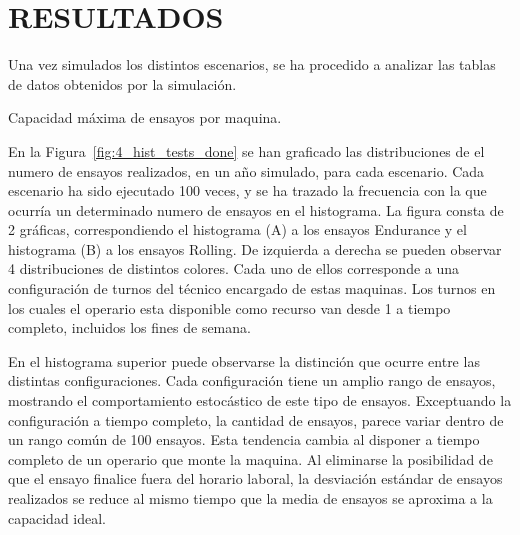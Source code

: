 
\section{RESULTADOS}

Una vez simulados los distintos escenarios,
se ha procedido a analizar las tablas de datos obtenidos por la simulación.

\begin{table}
	\centering
	\caption{Capacidad máxima de ensayos por maquina.}
	
	\label{tab:4_tbl_max_cap}
\end{table}

En la Figura~\ref{fig:4_hist_tests_done} se han graficado
las distribuciones de el numero de ensayos realizados, en un año simulado,
para cada escenario.
Cada escenario ha sido ejecutado 100 veces, y se ha trazado la frecuencia
con la que ocurría un determinado numero de ensayos en el histograma.
La figura consta de 2 gráficas,
correspondiendo el histograma (A) a los ensayos Endurance
y el histograma (B) a los ensayos Rolling.
De izquierda a derecha se pueden observar 4 distribuciones de distintos colores.
Cada uno de ellos corresponde a una configuración de turnos
del técnico encargado de estas maquinas.
Los turnos en los cuales el operario esta disponible como recurso
van desde 1 a tiempo completo, incluidos los fines de semana.

En el histograma superior puede observarse la distinción
que ocurre entre las distintas configuraciones.
Cada configuración tiene un amplio rango de ensayos,
mostrando el comportamiento estocástico de este tipo de ensayos.
Exceptuando la configuración a tiempo completo,
la cantidad de ensayos, parece variar dentro de un rango común de 100 ensayos.
Esta tendencia cambia al disponer a tiempo completo
de un operario que monte la maquina.
Al eliminarse la posibilidad
de que el ensayo finalice fuera del horario laboral,
la desviación estándar de ensayos realizados se reduce al mismo tiempo
que la media de ensayos se aproxima a la capacidad ideal.

